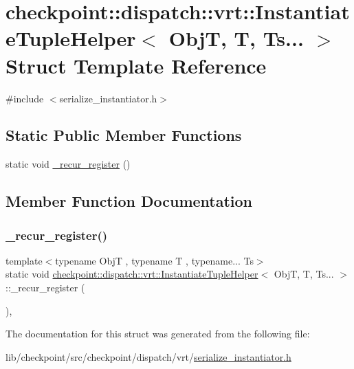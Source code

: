 \hypertarget{structcheckpoint_1_1dispatch_1_1vrt_1_1_instantiate_tuple_helper_3_01_obj_t_00_01_t_00_01_ts_8_8_8_01_4}{}\section{checkpoint\+:\+:dispatch\+:\+:vrt\+:\+:Instantiate\+Tuple\+Helper$<$ ObjT, T, Ts... $>$ Struct Template Reference}
\label{structcheckpoint_1_1dispatch_1_1vrt_1_1_instantiate_tuple_helper_3_01_obj_t_00_01_t_00_01_ts_8_8_8_01_4}


{\ttfamily \#include $<$serialize\+\_\+instantiator.\+h$>$}

\subsection*{Static Public Member Functions}
\begin{DoxyCompactItemize}
\item 
static void \hyperlink{structcheckpoint_1_1dispatch_1_1vrt_1_1_instantiate_tuple_helper_3_01_obj_t_00_01_t_00_01_ts_8_8_8_01_4_a7b69b771351767708a234443e6f9c707}{\+\_\+recur\+\_\+register} ()
\end{DoxyCompactItemize}


\subsection{Member Function Documentation}
\mbox{\label{structcheckpoint_1_1dispatch_1_1vrt_1_1_instantiate_tuple_helper_3_01_obj_t_00_01_t_00_01_ts_8_8_8_01_4_a7b69b771351767708a234443e6f9c707}} 
\subsubsection{\texorpdfstring{\+\_\+recur\+\_\+register()}{\_recur\_register()}}
{\footnotesize\ttfamily template$<$typename ObjT , typename T , typename... Ts$>$ \\
static void \hyperlink{structcheckpoint_1_1dispatch_1_1vrt_1_1_instantiate_tuple_helper}{checkpoint\+::dispatch\+::vrt\+::\+Instantiate\+Tuple\+Helper}$<$ ObjT, T, Ts... $>$\+::\+\_\+recur\+\_\+register (\begin{DoxyParamCaption}{ }\end{DoxyParamCaption})\hspace{0.3cm}{\ttfamily [inline]}, {\ttfamily [static]}}



The documentation for this struct was generated from the following file\+:\begin{DoxyCompactItemize}
\item 
lib/checkpoint/src/checkpoint/dispatch/vrt/\hyperlink{serialize__instantiator_8h}{serialize\+\_\+instantiator.\+h}\end{DoxyCompactItemize}
